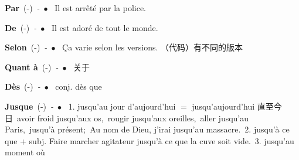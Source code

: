 \documentclass[10pt,a4paper,twoside]{article} %
\newcommand{\entry}[4]{\textbf{#1}\ {(#2)}\ \textit{#3}\ $\bullet$\ {#4}} %
\begin{document}
\begin{CJK*}{UTF8}{gkai}
\begin{multicols}{2}

\entry{Par}{-}{-}
{
Il est arrêté par la police.
}

\entry{De}{-}{-}
{
Il est adoré de tout le monde.
}

\entry{Selon}{-}{-}
{
Ça varie selon les versions. （代码）有不同的版本
}

\entry{Quant à}{-}{-}
{
关于
}

\entry{Dès}{-}{-}
{
conj. dès que 
}

\entry{Jusque}{-}{-}
{
1. jusqu'au jour d'aujourd'hui $=$ jusqu'aujourd'hui 直至今日\ 
avoir froid jusqu'aux os,\ rougir jusqu'aux oreilles,\ aller jusqu'au Paris,\ jusqu'à présent;\
Au nom de Dieu, j'irai jusqu'au massacre.\ 
2. jusqu'à ce que + subj. Faire marcher agitateur jusqu'à ce que la cuve soit vide.\ 
3. jusqu'au moment o\`u
}

\end{multicols}

\end{CJK*}
\end{document}
